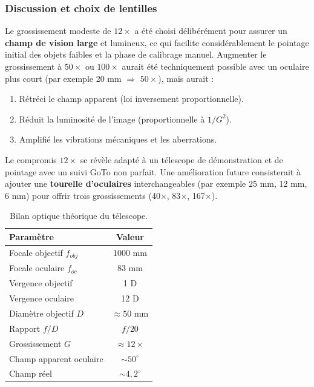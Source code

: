 \documentclass[12pt,a4paper]{report}
\begin{document}
\subsubsection{Discussion et choix de lentilles}
Le grossissement modeste de $12\times$ a été choisi délibérément pour assurer un \textbf{champ de vision large} et lumineux, ce qui facilite considérablement le pointage initial des objets faibles et la phase de calibrage manuel. Augmenter le grossissement à $50\times$ ou $100\times$ aurait été techniquement possible avec un oculaire plus court (par exemple 20 mm $\Rightarrow$ $50\times$), mais aurait :
\begin{enumerate}
    \item Rétréci le champ apparent (loi inversement proportionnelle).
    \item Réduit la luminosité de l'image (proportionnelle à $1/G^2$).
    \item Amplifié les vibrations mécaniques et les aberrations.
\end{enumerate}
Le compromis $12\times$ se révèle adapté à un télescope de démonstration et de pointage avec un suivi GoTo non parfait. Une amélioration future consisterait à ajouter une \textbf{tourelle d'oculaires} interchangeables (par exemple 25 mm, 12 mm, 6 mm) pour offrir trois grossissements (40$\times$, 83$\times$, 167$\times$).

\begin{table}[H]
    \centering
    \caption{Bilan optique théorique du télescope.}
    \begin{tabular}{|l|c|}
        \hline
        \textbf{Paramètre} & \textbf{Valeur} \\
        \hline
        Focale objectif $f_{obj}$ & 1000 mm \\
        Focale oculaire $f_{oc}$ & 83 mm \\
        Vergence objectif & 1 D \\
        Vergence oculaire & 12 D \\
        Diamètre objectif $D$ & $\approx 50$ mm \\
        Rapport $f/D$ & $f/20$ \\
        Grossissement $G$ & $\approx 12\times$ \\
        Champ apparent oculaire & $\sim 50^\circ$ \\
        Champ réel & $\sim 4{,}2^\circ$ \\
        \hline
    \end{tabular}
\end{table}
\end{document}
